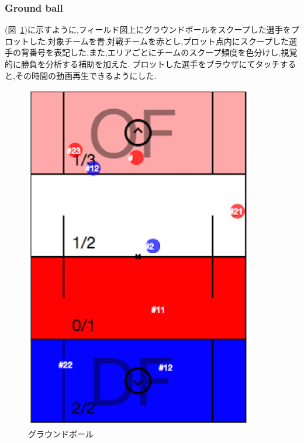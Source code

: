 \documentclass[sotsuron]{kuee}
\begin{document}
			\subsubsection{Ground ball}
				(図~\ref{fig:gb})に示すように,フィールド図上にグラウンドボールをスクープした選手をプロットした.対象チームを青,対戦チームを赤とし,プロット点内にスクープした選手の背番号を表記した.また,エリアごとにチームのスクープ頻度を色分けし,視覚的に勝負を分析する補助を加えた.
				プロットした選手をブラウザにてタッチすると,その時間の動画再生できるようにした.
					\begin{figure}
						\begin{center}
							\includegraphics[width=10cm]{gb.eps}
						\end{center}
						\caption{グラウンドボール}
				  		\label{fig:gb}
					\end{figure}
\end{document}

